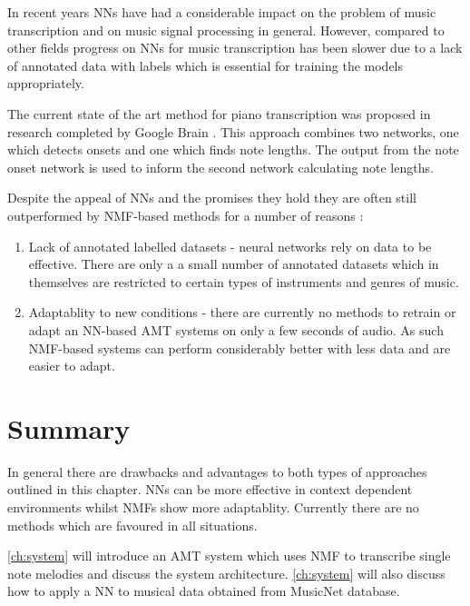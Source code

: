 \begin{enumerate}
        \begin{figure}[!b]
          \centering
          \texttt{[image: \\Pic\{png]}{log_loss}}
          \caption{Binary cross entropy function that is useful in
            classification tasks used in conjuction with a softmax activation
            function on the output}
          \label{review:fig:log-loss}
        \end{figure}

\end{enumerate}

In recent years NNs have had a considerable impact on the problem of music
transcription and on music signal processing in general. However, compared to
other fields progress on NNs for music transcription has been slower due to a
lack of annotated data with labels which is essential for training the models
appropriately. \cite{end-to-end-transcription2017:Carvalho}

The current state of the art method for piano transcription was proposed in
research completed by Google Brain \cite{google2018:Elsen}. This approach
combines two networks, one which detects onsets and one which finds note
lengths. The output from the note onset network is used to inform the second
network calculating note lengths.

Despite the appeal of NNs and the promises they hold they are often still
outperformed by NMF-based methods for a number of reasons :
\begin{enumerate}
  \item Lack of annotated labelled datasets - neural networks rely on data to be
        effective. There are only a a small number of annotated datasets which
        in themselves are restricted to certain types of instruments and genres
        of music. \cite{ground-truths:Su}
  \item Adaptablity to new conditions - there are currently no methods to
        retrain or adapt an NN-based AMT systems on only a few seconds of audio.
        As such NMF-based systems can perform considerably better with less data
        and are easier to adapt.
\end{enumerate}

\section{Summary}

In general there are drawbacks and advantages to both types of approaches
outlined in this chapter. NNs can be more effective in context dependent
environments whilst NMFs show more adaptablity. Currently there are no methods
which are favoured in all situations.

\autoref{ch:system} will introduce an AMT system which uses NMF to transcribe
single note melodies and discuss the system architecture. \autoref{ch:system}
will also discuss how to apply a NN to musical data obtained from
\citeyear{thickstun2018invariances} MusicNet database.